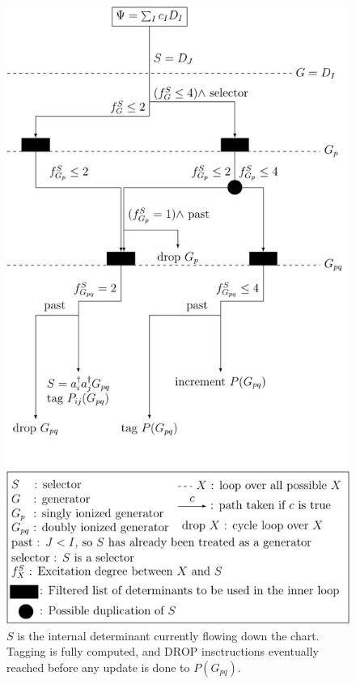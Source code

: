 \documentclass[./thesis.tex]{subfiles}
\begin{document}
\begin{figure}[h!]
	\begin{center}
		\includegraphics[height=0.90\textheight]{figures/cipsi/selection}
	\end{center}
        \caption{$S$ is the internal determinant currently flowing down the chart.
        Tagging is fully computed, and $\text{DROP}$ insctructions eventually reached before any update is done to $P(G_{pq})$.}
        \label{fig:selection}	
\end{figure}
\end{document}
